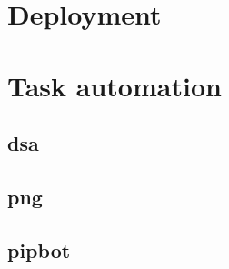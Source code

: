 \lipsum[18-26]


\section{Deployment}

\lipsum[12-24]


\section{Task automation}

\lipsum[50]

\subsection{dsa}

\lipsum[35-42]

\subsection{png}

\lipsum[40-48]

\subsection{pipbot}

\lipsum[35-47]
